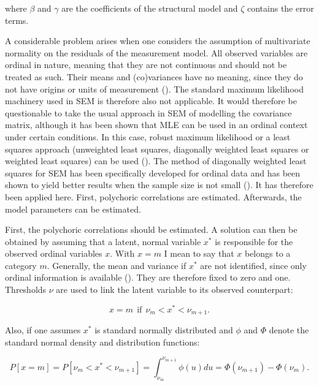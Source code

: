 \documentclass[11pt]{article}
\begin{document}
where $\beta$ and $\gamma$ are the coefficients of the structural model and
$\zeta$ contains the error terms.


A considerable problem arises when one considers the assumption of multivariate
normality on the residuals of the measurement model. All observed variables are
ordinal in
nature, meaning that they are not continuous and should not be treated as such.
Their means and (co)variances have no meaning, since they do not have origins or
units of measurement (\cite{joreskog1994}). The standard maximum likelihood
machinery used in SEM is therefore also not applicable. It would therefore be
questionable to take the usual approach in SEM of modelling the covariance
matrix, although it has been shown that MLE can be used in an ordinal context
under certain conditions. In this case, robust maximum likelihood or a least
squares approach (unweighted least squares, diagonally weighted least squares or
weighted least squares) can be used (\cite{yangwallentin2010}). The method of
diagonally weighted least squares for SEM has been specifically developed for
ordinal data and has been shown to yield better results when the sample size is
not small (\cite{li2016}). It has therefore been applied here. First, polychoric
correlations are estimated. Afterwards, the model parameters can be estimated. 

First, the polychoric correlations should be estimated. A solution can then be
obtained by assuming that a latent, normal variable $x^*$ is responsible for the
observed ordinal variables $x$. With $x=m$ I mean to say that $x$ belongs to a
category $m$. Generally, the mean and variance if $x^*$ are not identified,
since only ordinal information is available (\cite{simsek2012}). They are
therefore fixed to zero and one. Thresholds $\nu$ are used to link the latent
variable to its observed counterpart:

\begin{equation}
  x = m \:\: \text{if} \:\: \nu_m < x^* < \nu_{m+1} .
\end{equation}

Also, if one assumes $x^*$ is standard normally distributed and $\phi$ and
$\Phi$ denote the standard normal density and distribution functions:

\begin{equation}
  P[x=m] = P[\nu_m < x^* < \nu_{m+1}] = \int^{\nu_{m+1}}_{\nu_m} \phi(u)du = \Phi(\nu_{m+1}) - \Phi(\nu_m) .
\end{equation}
\end{document}
